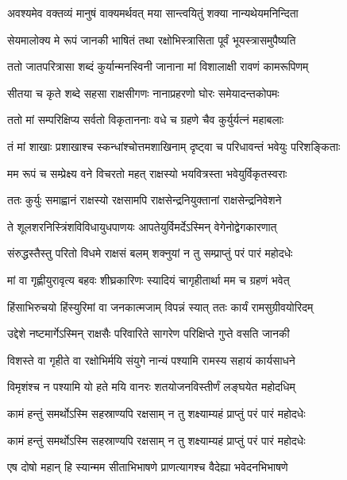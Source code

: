 \twolineshloka
{अवश्यमेव वक्तव्यं मानुषं वाक्यमर्थवत्}
{मया सान्त्वयितुं शक्या नान्यथेयमनिन्दिता} %

\twolineshloka
{सेयमालोक्य मे रूपं जानकी भाषितं तथा}
{रक्षोभिस्त्रासिता पूर्वं भूयस्त्रासमुपैष्यति} %

\twolineshloka
{ततो जातपरित्रासा शब्दं कुर्यान्मनस्विनी}
{जानाना मां विशालाक्षी रावणं कामरूपिणम्} %

\twolineshloka
{सीतया च कृते शब्दे सहसा राक्षसीगणः}
{नानाप्रहरणो घोरः समेयादन्तकोपमः} %

\twolineshloka
{ततो मां सम्परिक्षिप्य सर्वतो विकृताननाः}
{वधे च ग्रहणे चैव कुर्युर्यत्नं महाबलाः} %

\twolineshloka
{तं मां शाखाः प्रशाखाश्च स्कन्धांश्चोत्तमशाखिनाम्}
{दृष्ट्वा च परिधावन्तं भवेयुः परिशङ्किताः} %

\twolineshloka
{मम रूपं च सम्प्रेक्ष्य वने विचरतो महत्}
{राक्षस्यो भयवित्रस्ता भवेयुर्विकृतस्वराः} %

\twolineshloka
{ततः कुर्युः समाह्वानं राक्षस्यो रक्षसामपि}
{राक्षसेन्द्रनियुक्तानां राक्षसेन्द्रनिवेशने} %

\twolineshloka
{ते शूलशरनिस्त्रिंशविविधायुधपाणयः}
{आपतेयुर्विमर्देऽस्मिन् वेगेनोद्वेगकारणात्} %

\twolineshloka
{संरुद्धस्तैस्तु परितो विधमे राक्षसं बलम्}
{शक्नुयां न तु सम्प्राप्तुं परं पारं महोदधेः} %

\twolineshloka
{मां वा गृह्णीयुरावृत्य बहवः शीघ्रकारिणः}
{स्यादियं चागृहीतार्था मम च ग्रहणं भवेत्} %

\twolineshloka
{हिंसाभिरुचयो हिंस्युरिमां वा जनकात्मजाम्}
{विपन्नं स्यात् ततः कार्यं रामसुग्रीवयोरिदम्} %

\twolineshloka
{उद्देशे नष्टमार्गेऽस्मिन् राक्षसैः परिवारिते}
{सागरेण परिक्षिप्ते गुप्ते वसति जानकी} %

\twolineshloka
{विशस्ते वा गृहीते वा रक्षोभिर्मयि संयुगे}
{नान्यं पश्यामि रामस्य सहायं कार्यसाधने} %

\twolineshloka
{विमृशंश्च न पश्यामि यो हते मयि वानरः}
{शतयोजनविस्तीर्णं लङ्घयेत महोदधिम्} %

\twolineshloka
{कामं हन्तुं समर्थोऽस्मि सहस्राण्यपि रक्षसाम्}
{न तु शक्ष्याम्यहं प्राप्तुं परं पारं महोदधेः} %

\twolineshloka
{कामं हन्तुं समर्थोऽस्मि सहस्राण्यपि रक्षसाम्}
{न तु शक्ष्याम्यहं प्राप्तुं परं पारं महोदधेः} %

\twolineshloka
{एष दोषो महान् हि स्यान्मम सीताभिभाषणे}
{प्राणत्यागश्च वैदेह्या भवेदनभिभाषणे} %

